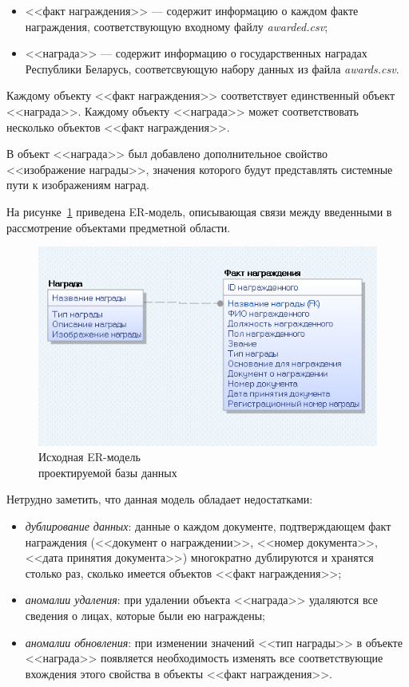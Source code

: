 \begin{itemize}
  \item <<факт награждения>> --- содержит информацию о каждом факте награждения,
    соответствующую входному файлу \textit{awarded.csv};
  \item <<награда>> --- содержит информацию о государственных наградах
    Республики Беларусь, соответсвующую набору данных из файла \textit{awards.csv}.
\end{itemize}

Каждому объекту <<факт награждения>> соответствует единственный
объект <<награда>>.
Каждому объекту <<награда>> может соответствовать несколько объектов
<<факт награждения>>.

В объект <<награда>> был добавлено дополнительное свойство
<<изображение награды>>, значения которого будут представлять
системные пути к изображениям наград.

На рисунке~\ref{fig:er_naive} приведена ER-модель, описывающая связи между 
введенными в рассмотрение объектами предметной области.

\begin{figure}[h]
  \centering
  \includegraphics[width=130mm]{pic/er_naive.png}
  \caption{Исходная ER-модель \\ проектируемой базы данных}
  \label{fig:er_naive}
\end{figure}

Нетрудно заметить, что данная модель обладает недостатками:
\begin{itemize}
\item
  \textit{дублирование данных}: данные о каждом документе,
  подтверждающем факт награждения
  (<<документ о награждении>>, <<номер документа>>, 
  <<дата принятия документа>>) многократно дублируются и хранятся столько раз,
  сколько имеется объектов <<факт награждения>>;
\item
  \textit{аномалии удаления}: при удалении объекта <<награда>> удаляются все сведения
  о лицах, которые были ею награждены;
\item
  \textit{аномалии обновления}: при изменении значений <<тип награды>> в объекте
  <<награда>> появляется необходимость изменять все соответствующие вхождения этого свойства в
  объекты <<факт награждения>>.
\end{itemize}

